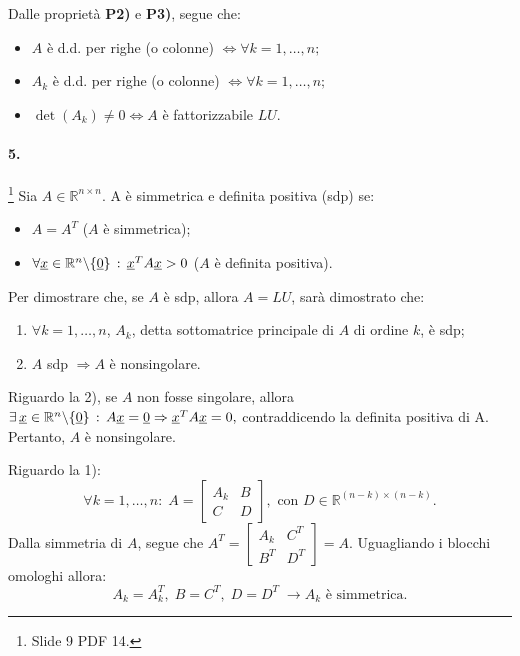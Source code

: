 \noindent Dalle proprietà \textbf{P2)} e \textbf{P3)}, segue che:
\begin{itemize}
    \item $A$ è d.d. per righe (o colonne) $\iff\forall k=1,\hdots,n;$
    \item $A_k$ è d.d. per righe (o colonne) $\iff\forall k=1,\hdots,n;$
    \item $\det(A_k)\neq 0\iff A$ è fattorizzabile $LU.$
\end{itemize}

\paragraph{5.}\footnote{Slide 9 PDF 14.} Sia $A\in\mathbb R^{n\times n}.$ A è simmetrica e definita positiva (sdp) se:
\begin{itemize}
    \item $A=A^T$ ($A$ è simmetrica);
    \item $\forall \uline x\in\mathbb R^n\backslash\{\uline 0\}\,:\, \uline x^T A \uline x > 0$ ($A$ è definita positiva).
\end{itemize}
Per dimostrare che, se $A$ è sdp, allora $A=LU$, sarà dimostrato che:
\begin{enumerate}
    \item $\forall k=1,\hdots, n$, $A_k$, detta sottomatrice principale di $A$ di ordine $k$, è sdp;
    \item $A$ sdp $\Rightarrow A$ è nonsingolare.
\end{enumerate}

\noindent Riguardo la 2), se $A$ non fosse \gls{singolare}, allora $\exists\,\uline x\in\mathbb R^n\backslash\{\uline 0\}\, : \, A\uline x=\uline 0\Rightarrow\uline x^T A \uline x = 0,$ contraddicendo la definita positiva di A.
Pertanto, $A$ è nonsingolare.

\noindent Riguardo la 1): 
\begin{equation}\label{eq:ACompSimm}
\forall k=1,\hdots,n:\; 
A=\left[\begin{array}{c|c}
       A_k & B\\
       \hline
       C& D
    \end{array}
    \right],\text{ con } D\in\mathbb R^{(n-k)\times (n-k)}.    
\end{equation}
Dalla simmetria di $A$, segue che 
$A^T=\left[
\begin{array}{c|c}
    A_k & C^T\\
    \hline
    B^T & D^T
\end{array}
\right]=A.$ Uguagliando i blocchi omologhi allora:
\begin{equation*}
    A_k=A_k^T,\; B=C^T,\; D=D^T\;\rightarrow A_k \text{ è simmetrica.}
\end{equation*}

